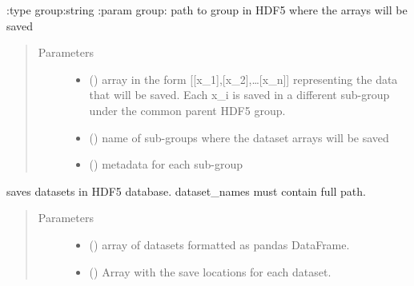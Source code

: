 \documentclass[letterpaper,10pt,english]{sphinxmanual}
\begin{document}
\begin{fulllineitems}
\begin{fulllineitems}
:type group:string
:param group: path to group in HDF5 where the arrays will be saved
\begin{quote}\begin{description}
\item[{Parameters}] \leavevmode\begin{itemize}
\item {} 
 () \textendash{} array in the form {[}{[}x\_1{]},{[}x\_2{]},…{[}x\_n{]}{]} representing the data that will be saved. Each x\_i is saved
in a different sub-group under the common parent HDF5 group.

\item {} 
 () \textendash{} name of sub-groups where the dataset arrays will be saved

\item {} 
 () \textendash{} metadata for each sub-group

\end{itemize}

\end{description}\end{quote}

\end{fulllineitems}


\begin{fulllineitems}
\label{\detokenize{shared:mleap.shared.files_io.FilesIO.save_datasets}}
saves datasets in HDF5 database. 
dataset\_names must contain full path.
\begin{quote}\begin{description}
\item[{Parameters}] \leavevmode\begin{itemize}
\item {} 
 () \textendash{} array of datasets formatted as pandas DataFrame.

\item {} 
 () \textendash{} Array with the save locations for each dataset.


\end{itemize}
\end{description}
\end{quote}
\end{fulllineitems}
\end{fulllineitems}
\end{document}
